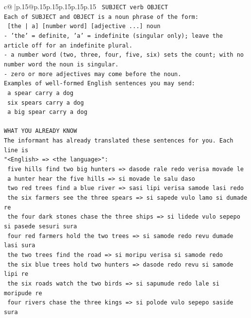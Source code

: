 \documentclass{article}
\begin{document}
{\begin{supertabular}{c@{$\;$}|p{.15\linewidth}@{}p{.15\linewidth}p{.15\linewidth}p{.15\linewidth}p{.15\linewidth}p{.15\linewidth}}
{{{\texttt{    SUBJECT  verb  OBJECT} \\
\texttt{Each of SUBJECT and OBJECT is a noun phrase of the form:} \\
\texttt{    {[}the | a{]}  {[}number word{]}  {[}adjective ...{]}  noun} \\
\texttt{{-} 'the' = definite, 'a' = indefinite (singular only); leave the article off for an indefinite plural.} \\
\texttt{{-} a number word (two, three, four, five, six) sets the count; with no number word the noun is singular.} \\
\texttt{{-} zero or more adjectives may come before the noun.} \\
\texttt{Examples of well{-}formed English sentences you may send:} \\
\texttt{    a spear carry a dog} \\
\texttt{    six spears carry a dog} \\
\texttt{    a big spear carry a dog} \\
\\ 
\texttt{WHAT YOU ALREADY KNOW} \\
\texttt{The informant has already translated these sentences for you. Each line is} \\
\texttt{"<English>  =>  <the language>":} \\
\texttt{    five hills find two big hunters  =>  dasode rale redo verisa movade le} \\
\texttt{    a hunter hear the five hills  =>  si movade le salu daso} \\
\texttt{    two red trees find a blue river  =>  sasi lipi verisa samode lasi redo} \\
\texttt{    the six farmers see the three spears  =>  si sapede vulo lamo si dumade re} \\
\texttt{    the four dark stones chase the three ships  =>  si lidede vulo sepepo si pasede sesuri sura} \\
\texttt{    four red farmers hold the two trees  =>  si samode redo revu dumade lasi sura} \\
\texttt{    the two trees find the road  =>  si moripu verisa si samode redo} \\
\texttt{    the six blue trees hold two hunters  =>  dasode redo revu si samode lipi re} \\
\texttt{    the six roads watch the two birds  =>  si sapumude redo lale si moripude re} \\
\texttt{    four rivers chase the three kings  =>  si polode vulo sepepo saside sura} \\
}}}
\end{supertabular}}
\end{document}
